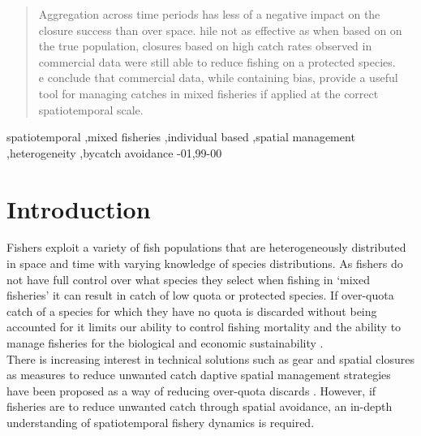 \documentclass[review]{elsarticle}
\begin{document}
\begin{frontmatter}
\begin{abstract}
 Aggregation across time periods has less of a negative
impact on the closure success than over space. hile not
as effective as when based on on the true population, closures based on high
catch rates observed in commercial data were still able to reduce fishing on a
protected species. \\ 
e conclude that commercial data, while containing bias,
provide a useful tool for managing catches in mixed fisheries if applied at the
correct spatiotemporal scale. \\
\end{abstract}

\begin{keyword}
spatiotemporal \sep mixed fisheries \sep individual based \sep spatial
management \sep heterogeneity \sep bycatch avoidance 
-01\sep  99-00
\end{keyword}

\end{frontmatter}

\linenumbers

\section{Introduction}

Fishers exploit a variety of fish populations that are heterogeneously
distributed in space and time with varying knowledge of species distributions.
As fishers do not have full control over what species they select when fishing
in `mixed fisheries' it can result in catch of low quota or protected species.
If over-quota catch of a species for which they have no quota is discarded
without being accounted for it limits our ability to control fishing mortality
\citep{Alverson1994, Crowder1998, Rijnsdorp2007} and the ability to manage
fisheries for the biological and economic sustainability \citep{Ulrich2011a,
	Batsleer2015}.\\

There is increasing interest in technical solutions such as gear and spatial
closures as measures to reduce unwanted catch
\citep{Kennelly2002, Catchpole2008, Bellido2011, Cosgrove2019}daptive spatial management strategies have been
proposed as a way of reducing over-quota discards \citep{Holmes2011,
	Little2014, Dunn2014a}. However, if fisheries are to reduce unwanted
catch through spatial avoidance, an in-depth understanding of spatiotemporal
fishery dynamics is required. \\
\end{document}
